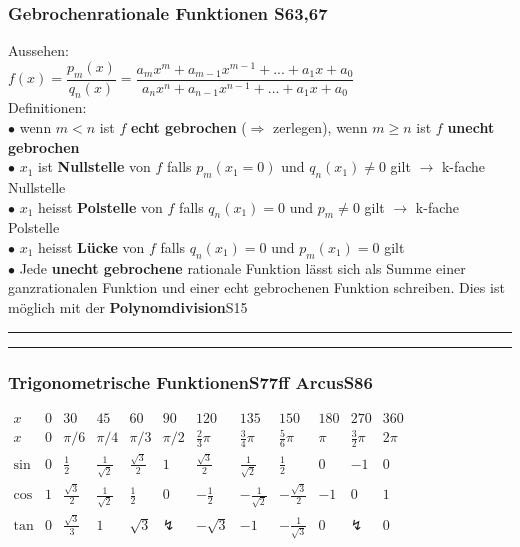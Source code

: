 \documentclass[6pt,a4paper]{scrartcl}
\begin{document}
\begin{multicols*}{2}
\subsubsection{Gebrochenrationale Funktionen \color{red}S63,67}
Aussehen:\\
\qquad $f(x)=\dfrac{p_{m}(x)}{q_{n}(x)}=\dfrac{a_{m}x^{m}+a_{m-1}x^{m-1}+...+a_{1}x+a_{0}}{a_{n}x^{n}+a_{n-1}x^{n-1}+...+a_{1}x+a_{0}}$\\
Definitionen:\\
$\bullet$ wenn $m<n$ ist $f$ \textbf{echt gebrochen} ($ \Rightarrow $ zerlegen), wenn $m\geq n$ ist $f$ \textbf{unecht gebrochen}\\
$\bullet$ $x_{1}$ ist \textbf{Nullstelle} von $f$ falls $p_{m}(x_{1}=0)$ und $q_{n}(x_{1}) \neq 0$ gilt $ \longrightarrow $ k-fache Nullstelle\\
$\bullet$ $x_{1}$ heisst \textbf{Polstelle} von $f$ falls $q_{n}(x_{1})=0$ und $p_{m} \neq 0$ gilt $ \longrightarrow $ k-fache Polstelle\\
$\bullet$ $x_{1}$ heisst \textbf{Lücke} von $f$ falls $q_{n}(x_{1})=0$ und $p_{m}(x_{1})=0$ gilt\\
$\bullet$ Jede \textbf{unecht gebrochene} rationale Funktion lässt sich als Summe einer ganzrationalen Funktion und einer echt gebrochenen Funktion schreiben. Dies ist möglich mit der \textbf{Polynomdivision}\color{red}S15\color{black}\\
\hrule
\hrule
\subsubsection{Trigonometrische Funktionen\color{red}S77ff \color{black} Arcus\color{red}S86}\begin{multicols}{2}
	\hspace{0pt}\scalebox{0.7}
	{
		$\begin{array}{c|c|c|c|c|c|c|c|c|c|c|c}
		x & 0& 30 & 45& 60 & 90 & 120 & 135& 150& 180 & 270 & 360 \\ \hline
		x & 0 & \pi / 6 & \pi / 4 & \pi / 3 & \pi / 2 & \frac{2}{3}\pi& \frac{3}{4}\pi& \frac{5}{6}\pi& \pi  & \frac{3}{2}\pi & 2 \pi \\ \hline
		\sin & 0 & \frac{1}{2} & \frac{1}{\sqrt{2}} & \frac{\sqrt 3}{2} & 1 & \frac{\sqrt 3}{2} & \frac{1}{\sqrt{2}} & \frac{1}{2} & 0 & -1 & 0 \\
		\cos & 1 & \frac{\sqrt 3}{2} & \frac{1}{\sqrt 2} & \frac{1}{2} & 0 & -\frac{1}{2} & -\frac{1}{\sqrt 2}  & -\frac{\sqrt 3}{2}   & -1 & 0 & 1 \\
		\tan & 0 & \frac{\sqrt{3}}{3}&1 &\sqrt{3} & \lightning & -\sqrt{3}& -1& -\frac{1}{\sqrt{3}} & 0 & \lightning & 0\\
		\end{array}$
	}\
	

\end{multicols}
\end{multicols*}
\end{document}
